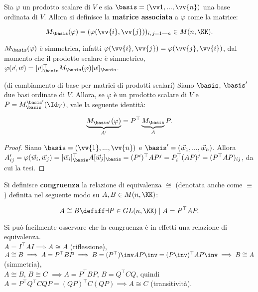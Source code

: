 \begin{definition}
	Sia $\varphi$ un prodotto scalare di $V$ e sia $\basis = (\vv1, ..., \vv{n})$ una base ordinata di $V$. Allora si definisce la \textbf{matrice associata}
	a $\varphi$ come la matrice:
	
	\[ M_\basis(\varphi) = (\varphi(\vv{i}, \vv{j}))_{i,\,j = 1\text{---}n} \in M(n, \KK). \] 
\end{definition}

\begin{remark}\nl
	\li $M_\basis(\varphi)$ è simmetrica, infatti $\varphi(\vv{i}, \vv{j}) = \varphi(\vv{j}, \vv{i})$,
	dal momento che il prodotto scalare è simmetrico, \\
	\li $\varphi(\vec{v}, \vec{w}) = [\vec{v}]_\basis^\top M_\basis(\varphi) [\vec{w}]_\basis$.
\end{remark}

\begin{theorem} (di cambiamento di base per matrici di prodotti scalari) Siano $\basis$, $\basis'$ due
	basi ordinate di $V$. Allora, se $\varphi$ è un prodotto scalare di $V$ e $P = M^{\basis'}_{\basis}(\Id_V)$, vale la seguente identità:
	
	\[ \underbrace{M_{\basis'}(\varphi)}_{A'} = P^\top \underbrace{M_{\basis}}_{A} P. \]
\end{theorem}

\begin{proof} Siano $\basis = (\vv{1}, ..., \vv{n})$ e $\basis' = (\vec{w}_1, ..., \vec{w}_n)$. Allora
	$A'_{ij} = \varphi(\vec{w}_i, \vec{w}_j) = [\vec{w}_i]_{\basis}^\top A [\vec{w}_j]_{\basis} =
	(P^i)^\top A P^j = P_i^\top (AP)^j = (P^\top AP)_{ij}$, da cui la tesi.
\end{proof}

\begin{definition}
	Si definisce \textbf{congruenza} la relazione di equivalenza $\cong$ (denotata anche come $\equiv$) definita nel seguente
	modo su $A, B \in M(n, \KK)$:
	
	\[ A \cong B \defiff \exists P \in GL(n, \KK) \mid A = P^\top A P. \]
\end{definition}

\begin{remark}
	Si può facilmente osservare che la congruenza è in effetti una relazione di equivalenza. \\
	
	\li $A = I^\top A I \implies A \cong A$ (riflessione), \\
	\li $A \cong B \implies A = P^\top B P \implies B = (P^\top)\inv A P\inv = (P\inv)^\top A P\inv \implies B \cong A$ (simmetria), \\
	\li $A \cong B$, $B \cong C$ $\implies A = P^\top B P$, $B = Q^\top C Q$, quindi $A = P^\top Q^\top C Q P =
	(QP)^\top C (QP) \implies A \cong C$ (transitività). 
\end{remark}

